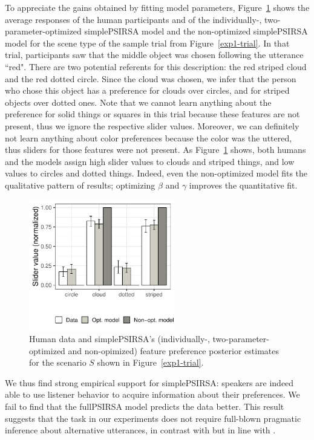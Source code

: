 \documentclass[10pt,a4paper]{article}
\begin{document}
To appreciate the gains obtained by fitting model parameters, Figure~\ref{barplot_x4} shows the average responses of the human participants and of the individually-, two-parameter-optimized simplePSIRSA model and the non-optimized simplePSIRSA model for the scene type of the sample trial from Figure~\ref{exp1-trial}.
In that trial, participants saw that the middle object was chosen following the utterance ``red". There are two potential referents for this description: the red striped cloud and the red dotted circle. Since the cloud was chosen, we infer that the person who chose this object has a preference for clouds over circles, and for striped objects over dotted ones. 
Note that we cannot learn anything about the preference for solid things or squares in this trial because these features are not present, thus we ignore the respective slider values. 
Moreover, we can definitely not learn anything about color preferences because the color was the uttered, thus sliders for those features were not present.  
As Figure~\ref{barplot_x4} shows, both humans and the models assign high slider values to clouds and striped things, and low values to circles and dotted things. Indeed, even the non-optimized model fits the qualitative pattern of results; optimizing $\beta$ and $\gamma$ improves the quantitative fit.


\begin{figure}[ht!]
	\centering
	\includegraphics[width=2.5in]{images/december_barplot_x4.pdf}
	\caption{Human data and simplePSIRSA's (individually-, two-parameter-optimized and non-opimized) feature preference posterior estimates for the scenario $S$ shown in Figure~\ref{exp1-trial}.}\label{barplot_x4}
\end{figure}


We thus find strong empirical support for simplePSIRSA: speakers are indeed able to use listener behavior to acquire information about their preferences. We fail to find that the fullPSIRSA model predicts the data better. This result suggests that the task in our experiments does not require full-blown pragmatic inference about alternative utterances, in contrast with  but in line with . 
\end{document}
